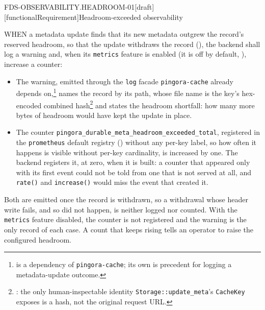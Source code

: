 \begin{requirement}{FDS-OBSERVABILITY.HEADROOM-01}[draft][functionalRequirement]{Headroom-exceeded observability}


  WHEN a metadata update finds that its new metadata outgrew the record's
  reserved headroom, so that the update withdraws the record
  (), the backend shall log a warning and, when
  its \texttt{metrics} feature is enabled (it is off by default,
  ), increase a counter:
  \begin{itemize}
    \item The warning, emitted through the \texttt{log} facade
      \texttt{pingora-cache} already depends
      on,\footnote{ is a
      dependency of \texttt{pingora-cache}; its own
      is precedent for logging a metadata-update outcome.} names the record
      by its path, whose file name is the key's hex-encoded combined
      hash\footnote{:
      the only human-inspectable identity \texttt{Storage::update\_meta}'s
      \texttt{CacheKey} exposes is a hash, not the original request URL.}
      and states the headroom shortfall: how many more bytes of headroom
      would have kept the update in place.
    \item The counter \texttt{pingora\_durable\_meta\_headroom\_exceeded\_total},
      registered in the \texttt{prometheus} default registry
      () without any per-key label, so
      how often it happens is visible without per-key cardinality, is
      increased by one. The backend registers it, at zero, when it is
      built: a counter that appeared only with its first event could not
      be told from one that is not served at all, and \texttt{rate()} and
      \texttt{increase()} would miss the event that created it.
  \end{itemize}
  Both are emitted once the record is withdrawn, so a withdrawal
  whose header write fails, and so did not happen, is neither logged nor
  counted. With the \texttt{metrics} feature disabled, the counter is not
  registered and the warning is the only record of each case. A count that
  keeps rising tells an operator to raise the configured headroom.



\end{requirement}

